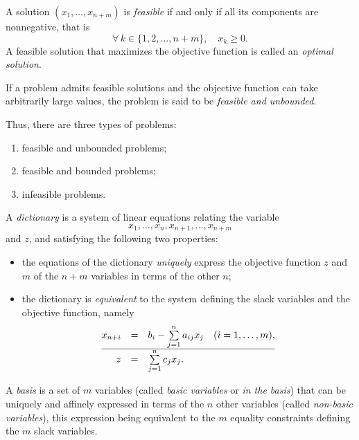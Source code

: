 \begin{remark}
A solution $(x_1,\dots,x_{n+m})$ is \emph{feasible} if and only if all its components are nonnegative, that is
\[
   \forall\,k\in\{1,2,\dots,n+m\},\quad x_k \ge 0 .
\]
A feasible solution that maximizes the objective function is called an \emph{optimal solution}.
\end{remark}

\begin{definition}
    If a problem admits feasible solutions and the objective function can take arbitrarily large values, the problem is said to be \emph{feasible and unbounded}.
\end{definition}

\begin{remark}
    Thus, there are three types of problems:
    \begin{enumerate}
        \item feasible and unbounded problems;
        \item feasible and bounded problems;
        \item infeasible problems.
    \end{enumerate}
\end{remark}

\begin{definition}
    A \emph{dictionary} is a system of linear equations relating the variable
    \[
        x_1,\dots,x_n,x_{n+1},\dots,x_{n+m}
    \]
    and $z$, and satisfying the following two properties:
    \begin{itemize}
        \item the equations of the dictionary \emph{uniquely} express the objective function $z$ and $m$ of the $n+m$ variables in terms of the other $n$;
        \item the dictionary is \emph{equivalent} to the system defining the slack variables and the objective function, namely
    \[
        \begin{array}{@{}rcl@{}}   
        x_{n+i} &=&b_i - \sum\limits_{j=1}^n a_{ij}x_j \quad (i=1,\dots,m),\\
        \hline z &=& \sum\limits_{j=1}^n c_j x_j .
        \end{array}
    \]
    \end{itemize}
\end{definition}

\begin{definition}[Basis]\label{def:base}
    A \emph{basis} is a set of $m$ variables (called \emph{basic variables} or \emph{in the basis}) that can be uniquely and affinely expressed in terms of the $n$ other variables (called \emph{non-basic variables}), this expression being equivalent to the $m$ equality constraints defining the $m$ slack variables.
\end{definition}


